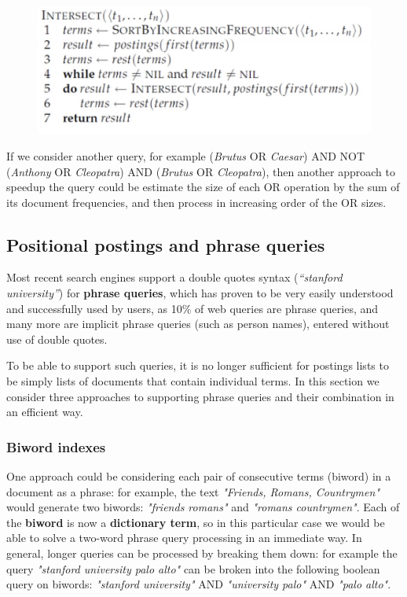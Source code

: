 \begin{figure}[h!]
		\centering
		\includegraphics[scale = 0.6]{img/sort_intersect.jpg}
		\label{sort_intersect}
\end{figure}

If we consider another query, for example (\textit{Brutus} OR \textit{Caesar}) AND NOT (\textit{Anthony} OR \textit{Cleopatra}) AND (\textit{Brutus} OR \textit{Cleopatra}), then another approach to speedup the query could be estimate the size of each OR operation by the sum of its document frequencies, and then process in increasing order of the OR sizes.

\subsection{Positional postings and phrase queries}
Most recent search engines support a double quotes syntax (\textit{“stanford university”}) for \textbf{phrase queries}, which has proven to be very easily understood and successfully used by users, as 10\% of web queries are phrase queries, and many more are implicit phrase queries (such as person names), entered without use of double quotes. 

To be able to support such queries, it is no longer sufficient for postings lists to be simply lists of documents that contain individual terms. In this section we consider three approaches to supporting phrase queries and their combination in an efficient way.

\subsubsection{Biword indexes}
One approach could be considering each pair of consecutive terms (biword) in a document as a phrase: for example, the text \textit{"Friends, Romans, Countrymen"} would generate two biwords: \textit{"friends romans"} and \textit{"romans countrymen"}. Each of the \textbf{biword} is now a \textbf{dictionary term}, so in this particular case we would be able to solve a two-word phrase query processing in an immediate way. In general, longer queries can be processed by breaking them down: for example the query \textit{"stanford university palo alto"} can be broken into the following boolean query on biwords: \textit{"stanford university"} AND \textit{"university palo"} AND \textit{"palo alto"}. 

